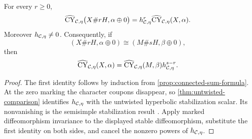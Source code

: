 \begin{proposition}
\label{prop:marked-stabilization-formula}
For every $r\geq0$,
\[
  \widehat{\operatorname{CY}}_{\mathcal{C},\eta}
    \bigl(X\#rH,\alpha\oplus0\bigr)
  =h_{\mathcal{C},\eta}^{r}
    \widehat{\operatorname{CY}}_{\mathcal{C},\eta}(X,\alpha).
\]
Moreover $h_{\mathcal{C},\eta}\neq0$.  Consequently, if
\[
  (X\#rH,\alpha\oplus0)
  \cong(M\#sH,\beta\oplus0),
\]
then
\[
  \widehat{\operatorname{CY}}_{\mathcal{C},\eta}(X,\alpha)
  =\widehat{\operatorname{CY}}_{\mathcal{C},\eta}(M,\beta)
   h_{\mathcal{C},\eta}^{s-r}.
\]
\end{proposition}

\begin{proof}
The first identity follows by induction from
\cref{prop:connected-sum-formula}.  At the zero marking the character
coupons disappear, so \cref{thm:untwisted-comparison} identifies
$h_{\mathcal{C},\eta}$ with the untwisted hyperbolic stabilization scalar.  Its
nonvanishing is the semisimple stabilization result
\cite[Theorem~3.5]{Reutter2023}.  Apply marked diffeomorphism invariance to
the displayed stable diffeomorphism, substitute the first identity on both
sides, and cancel the nonzero powers of $h_{\mathcal{C},\eta}$.
\end{proof}
